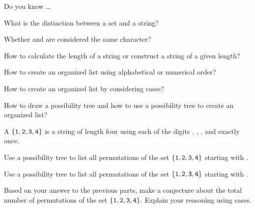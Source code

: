 \begin{exer}[\exerR] %
\label{exer_dyk_strings_trees}
    Do you know \ldots
        \begin{exerpart}
            \item What is the distinction between a set and a string?        
            \item Whether  and  are considered the same character?
            \item How to calculate the length of a string or construct a string of a given length?
            \item How to create an organized list using alphabetical or numerical order?
            \item How to create an organized list by considering cases?
            \item How to draw a possibility tree and how to use a possibility tree to create an organized list?
        \end{exerpart}
\end{exer}

\begin{exer} [\exerE]%
\label{exer_perm_trees}
    A  $\{\texttt{1},\texttt{2},\texttt{3},\texttt{4}\}$ is a string of length four using each of the digits , , , and  exactly once. 
    \begin{exerpart}
        \item Use a possibility tree to list all permutations of the set 
            $\{\texttt{1},\texttt{2},\texttt{3},\texttt{4}\}$
        starting with .
        \item Use a possibility tree to list all permutations of the set 
            $\{\texttt{1},\texttt{2},\texttt{3},\texttt{4}\}$
        starting with .
        \item Based on your answer to the previous parts, make a conjecture about the total number of permutations of the set 
            $\{\texttt{1},\texttt{2},\texttt{3},\texttt{4}\}.$
            Explain your reasoning using cases.
    \end{exerpart}
\end{exer}

